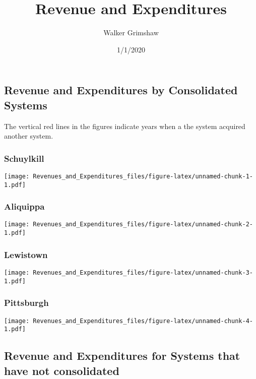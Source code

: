 \documentclass[]{article}
\title{Revenue and Expenditures}
\author{Walker Grimshaw}
\date{1/1/2020}
\begin{document}
\maketitle

\hypertarget{revenue-and-expenditures-by-consolidated-systems}{%
\subsection{Revenue and Expenditures by Consolidated
Systems}\label{revenue-and-expenditures-by-consolidated-systems}}

The vertical red lines in the figures indicate years when a the system
acquired another system.

\hypertarget{schuylkill}{%
\subsubsection{Schuylkill}\label{schuylkill}}

\texttt{[image: Revenues\_and\_Expenditures\_files/figure-latex/unnamed-chunk-1-1.pdf]}

\hypertarget{aliquippa}{%
\subsubsection{Aliquippa}\label{aliquippa}}

\texttt{[image: Revenues\_and\_Expenditures\_files/figure-latex/unnamed-chunk-2-1.pdf]}

\hypertarget{lewistown}{%
\subsubsection{Lewistown}\label{lewistown}}

\texttt{[image: Revenues\_and\_Expenditures\_files/figure-latex/unnamed-chunk-3-1.pdf]}

\hypertarget{pittsburgh}{%
\subsubsection{Pittsburgh}\label{pittsburgh}}

\texttt{[image: Revenues\_and\_Expenditures\_files/figure-latex/unnamed-chunk-4-1.pdf]}

\hypertarget{revenue-and-expenditures-for-systems-that-have-not-consolidated}{%
\subsection{Revenue and Expenditures for Systems that have not
consolidated}\label{revenue-and-expenditures-for-systems-that-have-not-consolidated}}
\end{document}
